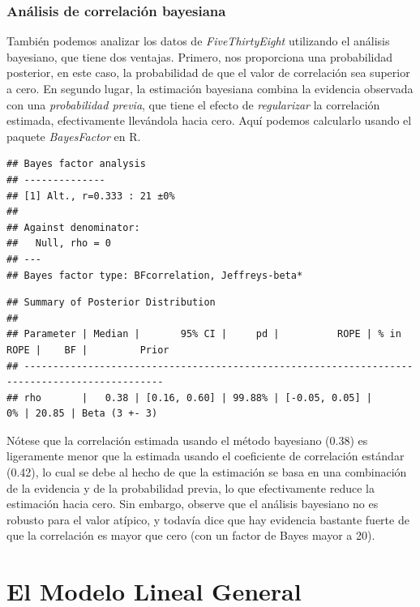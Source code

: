 \documentclass[
  12pt,
]{book}
\begin{document}
\hypertarget{anuxe1lisis-de-correlaciuxf3n-bayesiana}{%
\subsection{Análisis de correlación bayesiana}\label{anuxe1lisis-de-correlaciuxf3n-bayesiana}}

También podemos analizar los datos de \emph{FiveThirtyEight} utilizando el análisis bayesiano, que tiene dos ventajas. Primero, nos proporciona una probabilidad posterior, en este caso, la probabilidad de que el valor de correlación sea superior a cero. En segundo lugar, la estimación bayesiana combina la evidencia observada con una \emph{probabilidad previa}, que tiene el efecto de \emph{regularizar} la correlación estimada, efectivamente llevándola hacia cero. Aquí podemos calcularlo usando el paquete \emph{BayesFactor} en R.

\begin{verbatim}
## Bayes factor analysis
## --------------
## [1] Alt., r=0.333 : 21 ±0%
## 
## Against denominator:
##   Null, rho = 0 
## ---
## Bayes factor type: BFcorrelation, Jeffreys-beta*
\end{verbatim}

\begin{verbatim}
## Summary of Posterior Distribution
## 
## Parameter | Median |       95% CI |     pd |          ROPE | % in ROPE |    BF |         Prior
## ----------------------------------------------------------------------------------------------
## rho       |   0.38 | [0.16, 0.60] | 99.88% | [-0.05, 0.05] |        0% | 20.85 | Beta (3 +- 3)
\end{verbatim}

Nótese que la correlación estimada usando el método bayesiano (0.38) es ligeramente menor que la estimada usando el coeficiente de correlación estándar (0.42), lo cual se debe al hecho de que la estimación se basa en una combinación de la evidencia y de la probabilidad previa, lo que efectivamente reduce la estimación hacia cero. Sin embargo, observe que el análisis bayesiano no es robusto para el valor atípico, y todavía dice que hay evidencia bastante fuerte de que la correlación es mayor que cero (con un factor de Bayes mayor a 20).

\hypertarget{the-general-lineal-model}{%
\chapter{El Modelo Lineal General}\label{the-general-lineal-model}}
\end{document}
